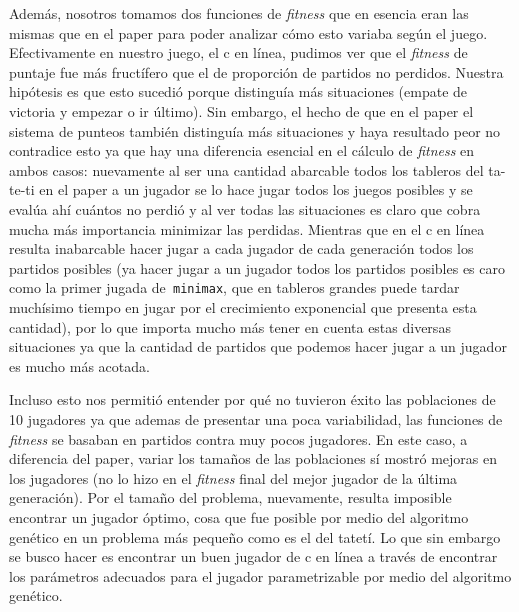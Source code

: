 \documentclass[A4paper,oneside,fleqn,11pt]{article}
\theoremstyle{definition}
\begin{document}
Además, nosotros tomamos dos funciones de \textit{fitness} que en esencia eran las mismas que en el paper para poder analizar cómo esto variaba según el juego. Efectivamente en nuestro juego, el c en línea, pudimos ver que el \textit{fitness} de puntaje fue más fructífero que el de proporción de partidos no perdidos. Nuestra hipótesis es que esto sucedió porque distinguía más situaciones (empate de victoria y empezar o ir último). Sin embargo, el hecho de que en el paper el sistema de punteos también distinguía más situaciones y haya resultado peor no contradice esto ya que hay una diferencia esencial en el cálculo de \textit{fitness} en ambos casos: nuevamente al ser una cantidad abarcable todos los tableros del ta-te-ti en el paper a un jugador se lo hace jugar todos los juegos posibles y se evalúa ahí cuántos no perdió y al ver todas las situaciones es claro que cobra mucha más importancia minimizar las perdidas. Mientras que en el c en línea resulta inabarcable hacer jugar a cada jugador de cada generación todos los partidos posibles (ya hacer jugar a un jugador todos los partidos posibles es caro como la primer jugada de\texttt{ minimax}, que en tableros grandes puede tardar muchísimo tiempo en jugar por el crecimiento exponencial que presenta esta cantidad), por lo que importa mucho más tener en cuenta estas diversas situaciones ya que la cantidad de partidos que podemos hacer jugar a un jugador es mucho más acotada.

Incluso esto nos permitió entender por qué no tuvieron éxito las poblaciones de 10 jugadores ya que ademas de presentar una poca variabilidad, las funciones de \textit{fitness} se basaban en partidos contra muy pocos jugadores. En este caso, a diferencia del paper, variar los tamaños de las poblaciones sí mostró mejoras en los jugadores (no lo hizo en el \textit{fitness} final del mejor jugador de la última generación). Por el tamaño del problema, nuevamente, resulta imposible encontrar un jugador óptimo, cosa que fue posible por medio del algoritmo genético en un problema más pequeño como es el del tatetí. Lo que sin embargo se busco hacer es encontrar un buen jugador de c en línea a través de encontrar los parámetros adecuados para el jugador parametrizable por medio del algoritmo genético.
\end{document}
